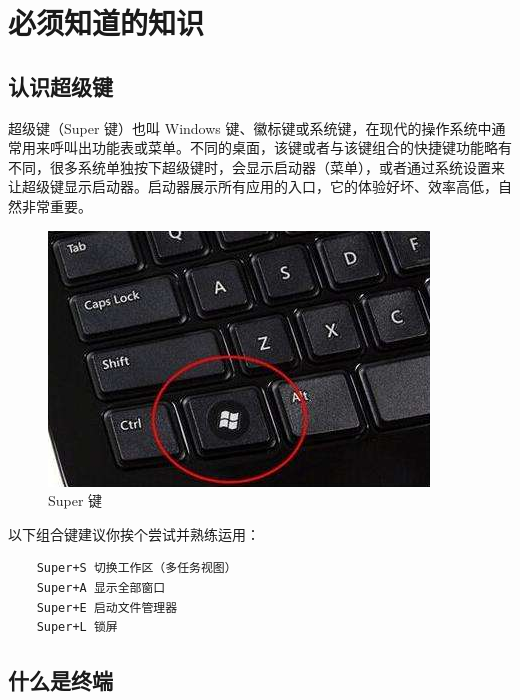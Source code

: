 
\ifx\all\undefined



\fi


\setcounter{chapter}{0}

\chapter{必须知道的知识}


\section{认识超级键}

\par 超级键（Super 键）也叫 Windows 键、徽标键或系统键，在现代的操作系统中通常用来呼叫出功能表或菜单。不同的桌面，该键或者与该键组合的快捷键功能略有不同，很多系统单独按下超级键时，会显示启动器（菜单），或者通过系统设置来让超级键显示启动器。启动器展示所有应用的入口，它的体验好坏、效率高低，自然非常重要。

\begin{figure} [htbp]
	\centering
	\includegraphics [scale=0.6] {images/ch01/2021-10-28_15-33-03.png}
	\caption{Super 键}
\end{figure}

\par 以下组合键建议你挨个尝试并熟练运用：
\begin{lstlisting}
    Super+S 切换工作区（多任务视图）
    Super+A 显示全部窗口
    Super+E 启动文件管理器
    Super+L 锁屏
\end{lstlisting}


\section{什么是终端}

